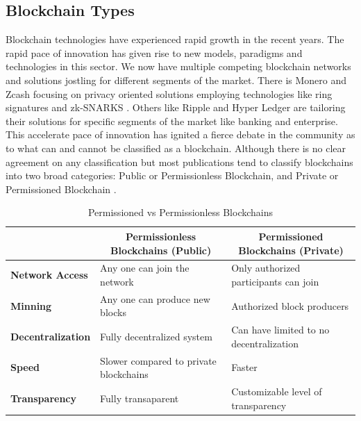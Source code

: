 \subsection{Blockchain Types}
Blockchain technologies have experienced rapid growth in the recent years. The rapid pace of innovation has given rise to new models, paradigms and technologies in this sector. We now have multiple competing blockchain networks and solutions jostling for different segments of the market. There is Monero and Zcash focusing on privacy oriented solutions employing technologies like ring signatures \cite{paper:008} and zk-SNARKS \cite{misc:019}. Others like Ripple and Hyper Ledger are tailoring their solutions for specific segments of the market like banking and enterprise. This accelerate pace of innovation has ignited a fierce debate in the community as to what can and cannot be classified as a blockchain. Although there is no clear agreement on any classification but most publications tend to classify blockchains into two broad categories: Public or Permissionless Blockchain, and Private or Permissioned Blockchain \cite{misc:017}.
\begin{table}[h]
\begin{tabular}{|l|l|l|}
\hline
                          & \multicolumn{1}{c|}{\textbf{Permissionless Blockchains (Public)}} & \multicolumn{1}{c|}{\textbf{Permissioned Blockchains (Private)}} \\ \hline
\textbf{Network Access}   & Any one can join the network                                      & Only authorized participants can join                            \\ \hline
\textbf{Minning}          & Any one can produce new blocks                                    & Authorized block producers                                       \\ \hline
\textbf{Decentralization} & Fully decentralized system                                        & Can have limited to no decentralization                          \\ \hline
\textbf{Speed}            & Slower compared to private blockchains                            & Faster                                                           \\ \hline
\textbf{Transparency}     & Fully transaparent                                                & Customizable level of transparency                               \\ \hline
\end{tabular}
\caption {Permissioned vs Permissionless Blockchains}
\end{table}

